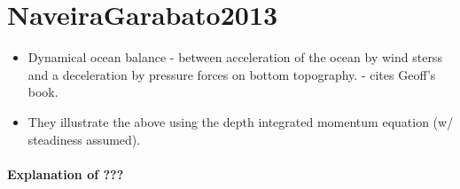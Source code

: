 \documentclass[..\Papers.tex]{subfiles}
\begin{document}
\section{NaveiraGarabato2013}
\citep{NaveiraGarabato2013}


\begin{itemize}
    \item Dynamical ocean balance - between acceleration of the ocean by wind sterss and a deceleration by pressure forces on bottom topography. - cites Geoff's book.
    \item They illustrate the above using the depth integrated momentum equation (w/ steadiness assumed).
\end{itemize}

\paragraph{Explanation of ???}
\end{document}
